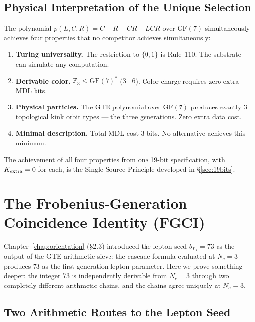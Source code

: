 \documentclass[11pt,openany]{book}
\theoremstyle{remark}
\newcommand{\poly}{p(L,C,R)}
\begin{document}
\FloatBarrier

\subsection*{Physical Interpretation of the Unique Selection}

The polynomial $\poly = C+R-CR-LCR$ over $\mathrm{GF}(7)$ simultaneously achieves
four properties that no competitor achieves simultaneously:
\begin{enumerate}[label=\textbf{(\arabic*)},leftmargin=*,itemsep=4pt]
\item \textbf{Turing universality.} The restriction to $\{0,1\}$ is Rule~110.
  The substrate can simulate any computation.
\item \textbf{Derivable color.} $\mathbb{Z}_3 \leq \mathrm{GF}(7)^*$ ($3 \mid 6$).
  Color charge requires zero extra MDL bits.
\item \textbf{Physical particles.} The GTE polynomial over $\mathrm{GF}(7)$ produces
  exactly 3 topological kink orbit types --- the three generations. Zero extra data cost.
\item \textbf{Minimal description.} Total MDL cost 3 bits. No alternative achieves this minimum.
\end{enumerate}

The achievement of all four properties from one 19-bit specification, with $K_{\rm extra} = 0$
for each, is the Single-Source Principle developed in \S\ref{sec:19bits}.

\section{The Frobenius-Generation Coincidence Identity (FGCI)}
\label{sec:fgci}

Chapter~\ref{chap:orientation} (§2.3) introduced the lepton seed $b_{L_1} = 73$ as
the output of the GTE arithmetic sieve: the cascade formula evaluated at $N_c = 3$
produces 73 as the first-generation lepton parameter. Here we prove something deeper:
the integer 73 is independently derivable from $N_c = 3$ through two completely
different arithmetic chains, and the chains agree uniquely at $N_c = 3$.

\subsection*{Two Arithmetic Routes to the Lepton Seed}
\end{document}
